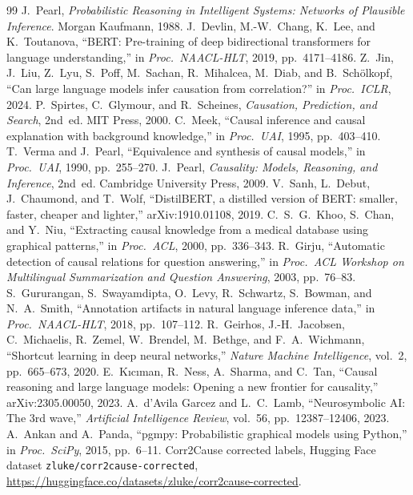 \documentclass[12pt,a4paper]{article}
\begin{document}
\begingroup
\small
\renewcommand{\refname}{References}
\begin{thebibliography}{99}\setlength{\itemsep}{2pt}
 J.~Pearl, \emph{Probabilistic Reasoning in Intelligent Systems: Networks of Plausible Inference}. Morgan Kaufmann, 1988.
 J.~Devlin, M.-W.~Chang, K.~Lee, and K.~Toutanova, ``BERT: Pre-training of deep bidirectional transformers for language understanding,'' in \emph{Proc.\ NAACL-HLT}, 2019, pp.~4171--4186.
 Z.~Jin, J.~Liu, Z.~Lyu, S.~Poff, M.~Sachan, R.~Mihalcea, M.~Diab, and B.~Sch\"olkopf, ``Can large language models infer causation from correlation?'' in \emph{Proc.\ ICLR}, 2024.
 P.~Spirtes, C.~Glymour, and R.~Scheines, \emph{Causation, Prediction, and Search}, 2nd~ed. MIT Press, 2000.
 C.~Meek, ``Causal inference and causal explanation with background knowledge,'' in \emph{Proc.\ UAI}, 1995, pp.~403--410.
 T.~Verma and J.~Pearl, ``Equivalence and synthesis of causal models,'' in \emph{Proc.\ UAI}, 1990, pp.~255--270.
 J.~Pearl, \emph{Causality: Models, Reasoning, and Inference}, 2nd~ed. Cambridge University Press, 2009.
 V.~Sanh, L.~Debut, J.~Chaumond, and T.~Wolf, ``DistilBERT, a distilled version of BERT: smaller, faster, cheaper and lighter,'' arXiv:1910.01108, 2019.
 C.~S.~G.~Khoo, S.~Chan, and Y.~Niu, ``Extracting causal knowledge from a medical database using graphical patterns,'' in \emph{Proc.\ ACL}, 2000, pp.~336--343.
 R.~Girju, ``Automatic detection of causal relations for question answering,'' in \emph{Proc.\ ACL Workshop on Multilingual Summarization and Question Answering}, 2003, pp.~76--83.
 S.~Gururangan, S.~Swayamdipta, O.~Levy, R.~Schwartz, S.~Bowman, and N.~A.~Smith, ``Annotation artifacts in natural language inference data,'' in \emph{Proc.\ NAACL-HLT}, 2018, pp.~107--112.
 R.~Geirhos, J.-H.~Jacobsen, C.~Michaelis, R.~Zemel, W.~Brendel, M.~Bethge, and F.~A.~Wichmann, ``Shortcut learning in deep neural networks,'' \emph{Nature Machine Intelligence}, vol.~2, pp.~665--673, 2020.
 E.~K{\i}c{\i}man, R.~Ness, A.~Sharma, and C.~Tan, ``Causal reasoning and large language models: Opening a new frontier for causality,'' arXiv:2305.00050, 2023.
 A.~d'Avila Garcez and L.~C.~Lamb, ``Neurosymbolic AI: The 3rd wave,'' \emph{Artificial Intelligence Review}, vol.~56, pp.~12387--12406, 2023.
 A.~Ankan and A.~Panda, ``pgmpy: Probabilistic graphical models using Python,'' in \emph{Proc.\ SciPy}, 2015, pp.~6--11.
 Corr2Cause corrected labels, Hugging Face dataset \texttt{zluke/corr2cause-corrected}, \url{https://huggingface.co/datasets/zluke/corr2cause-corrected}.
\end{thebibliography}
\endgroup
\end{document}
